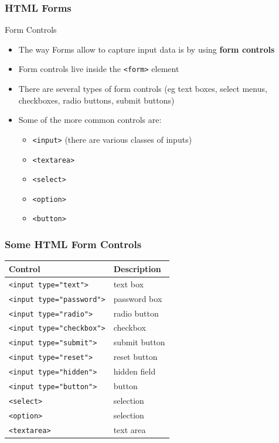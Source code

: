 \documentclass{beamer}\usepackage[]{graphicx}\usepackage[]{color}
\newcommand{\code}[1]{\texttt{#1}}
\newcommand{\low}[1]{\textcolor{lowlight}{#1}}
\begin{document}
\begin{frame}[fragile]
\frametitle{HTML Forms}

\begin{block}{Form Controls}
\begin{itemize}
 \item The way Forms allow to capture input data is by using \textbf{form controls}
 \item Form controls live inside the \code{<form>} element
 \item There are several types of form controls \low{(eg text boxes, select menus, checkboxes, radio buttons, submit buttons)}
 \item Some of the more common controls are: 
 \begin{itemize}
  \item \code{<input>} \low{(there are various classes of inputs)}
  \item \code{<textarea>}
  \item \code{<select>}
  \item \code{<option>}
  \item \code{<button>}
 \end{itemize}
\end{itemize}
\end{block}

\end{frame}


\begin{frame}
\frametitle{Some HTML Form Controls}

\begin{center}
 \begin{tabular}{l l}
  \hline
  Control & Description \\
  \hline
  \code{<input type="text">} & text box \\
  \code{<input type="password">} & password box \\
  \code{<input type="radio">} &  radio button \\
  \code{<input type="checkbox">} & checkbox \\
  \code{<input type="submit">} & submit button \\
  \code{<input type="reset">} & reset button \\
  \code{<input type="hidden">} & hidden field \\
  \code{<input type="button">} & button \\
  \code{<select>} & selection \\
  \code{<option>} & selection \\
  \code{<textarea>} & text area \\
  \hline
 \end{tabular}
\end{center}

\end{frame}
\end{document}
